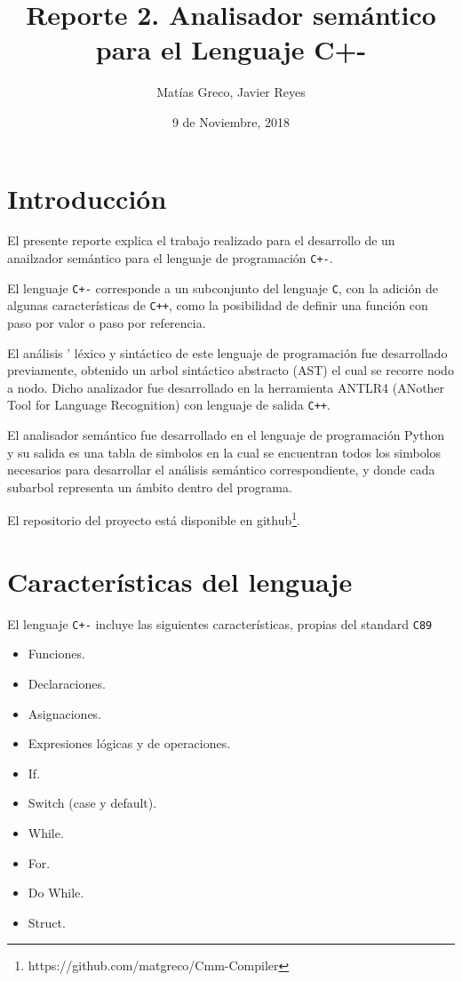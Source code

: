 \documentclass[12pt]{article}
\newcommand{\Cp}{\texttt{C+-}}
\newcommand{\C}{\texttt{C}}
\newcommand{\Cpp}{\texttt{C++}}
\begin{document}

\title{Reporte 2. Analisador semántico para el Lenguaje C+-}
\author{Mat\'ias Greco, Javier Reyes}
\date{9 de Noviembre, 2018}
\maketitle

\section*{Introducci\'on}
El presente reporte explica el trabajo realizado para el desarrollo de un anailzador sem\'antico para el lenguaje de programaci\'on \Cp.

El lenguaje \texttt{C+-} corresponde a un subconjunto del lenguaje \C, con la adici\'on de algunas caracter\'isticas de \Cpp, como la posibilidad de definir una funci\'on con paso por valor o paso por referencia.

El an\'alisis  ' l\'exico y sint\'actico de este lenguaje de programación fue desarrollado previamente, obtenido un arbol sintáctico abstracto (AST) el cual se recorre nodo a nodo. Dicho analizador fue desarrollado en la herramienta ANTLR4 (ANother Tool for Language Recognition) con lenguaje de salida \Cpp. 

El analisador sem\'antico fue desarrollado en el lenguaje de programación Python y su salida es una tabla de simbolos en la cual se encuentran todos los simbolos necesarios para desarrollar el an\'alisis sem\'antico correspondiente, y donde cada subarbol representa un \'ambito dentro del programa.

El repositorio del proyecto está disponible en github\footnote{https://github.com/matgreco/Cmm-Compiler}.


\section*{Caracter\'isticas del lenguaje}

El lenguaje \texttt{C+-} incluye las siguientes caracter\'isticas, propias del standard \texttt{C89}
\begin{itemize}
    \item Funciones.
    \item Declaraciones.
    \item Asignaciones.
    \item Expresiones l\'ogicas y de operaciones.
    \item If.
    \item Switch (case y default).
    \item While.
    \item For.
    \item Do While.
    \item Struct.
\end{itemize}
\end{document}
